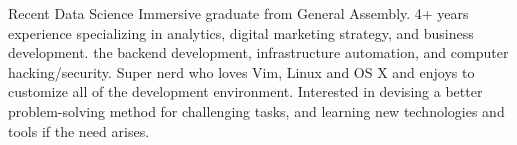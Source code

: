 

\begin{cvparagraph}

Recent Data Science Immersive graduate from General Assembly. 4+ years experience specializing in analytics, digital marketing strategy, and business development. the backend development, infrastructure automation, and computer hacking/security. Super nerd who loves Vim, Linux and OS X and enjoys to customize all of the development environment. Interested in devising a better problem-solving method for challenging tasks, and learning new technologies and tools if the need arises.
\end{cvparagraph}
